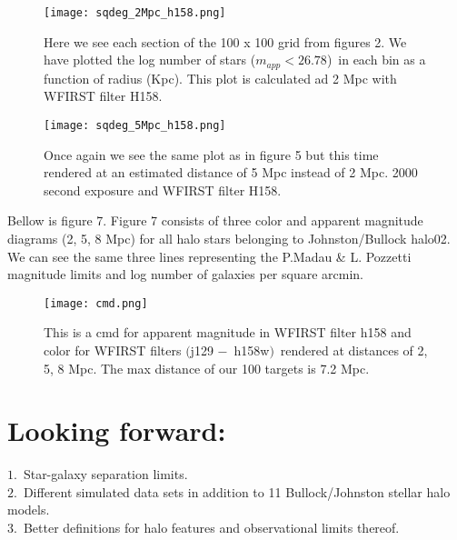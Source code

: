 \documentclass[11pt,a4paper,fleqn,notitlepage,oneside]{article}
\begin{document}
		\begin{figure}[H]\centering
			\texttt{[image: sqdeg\_2Mpc\_h158.png]}
		\caption{
			Here we see each section of the 100 x 100 grid from figures 2.
			We have plotted the log number of stars ($m_{app}<26.78$)\ in each bin as a function of radius (Kpc).
			This plot is calculated ad 2 Mpc with WFIRST filter H158.
		}
		\label{fig:nstars as function of radius 2Mpc}
		\end{figure}

		\begin{figure}[H]\centering
			\texttt{[image: sqdeg\_5Mpc\_h158.png]}
		\caption{
			Once again we see the same plot as in figure 5 but this time rendered at an estimated distance of 5 Mpc instead of 2 Mpc.
			2000 second exposure and WFIRST filter H158.
		}
		\label{fig:nstars as function of radius 5Mpc}
		\end{figure}

		Bellow is figure 7.
		Figure 7 consists of three color and apparent magnitude diagrams (2, 5, 8 Mpc) for all halo stars belonging to Johnston/Bullock halo02.
		We can see the same three lines representing the P.Madau \& L. Pozzetti magnitude limits and log number of galaxies per square arcmin.

		\begin{figure}[H]\centering
			\texttt{[image: cmd.png]}
		\caption{
			This is a cmd for apparent magnitude in WFIRST filter h158 and color for WFIRST filters $($j129 $-$\ h158w$)$\ rendered at distances of 2, 5, 8 Mpc.
			The max distance of our 100 targets is 7.2 Mpc.
		}
		\label{fig:cmd}
		\end{figure}

\section{Looking forward:} %
	\label{sec:looking_forward}

	$1.$\ Star-galaxy separation limits.\\

	$2.$\ Different simulated data sets in addition to 11 Bullock/Johnston stellar halo models.\\

	$3.$\ Better definitions for halo features and observational limits thereof.\\

{}


\end{document}
